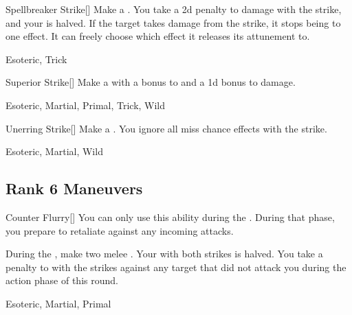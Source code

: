 \lowercase{\hypertarget{maneuver:Spellbreaker Strike}{}}\label{maneuver:Spellbreaker Strike}
\hypertarget{maneuver:Spellbreaker Strike}{}
\begin{freeability}[Rank 5]{Spellbreaker Strike}[]
Make a .
You take a \minus2d penalty to damage with the strike, and your  is halved.
If the target takes damage from the strike, it stops being  to one effect.
It can freely choose which effect it releases its attunement to.


 Esoteric, Trick
\end{freeability}
\vspace{0.25em}



\lowercase{\hypertarget{maneuver:Superior Strike}{}}\label{maneuver:Superior Strike}
\hypertarget{maneuver:Superior Strike}{}
\begin{freeability}[Rank 5]{Superior Strike}[]
Make a  with a  bonus to  and a \plus1d bonus to damage.


 Esoteric, Martial, Primal, Trick, Wild
\end{freeability}
\vspace{0.25em}



\lowercase{\hypertarget{maneuver:Unerring Strike}{}}\label{maneuver:Unerring Strike}
\hypertarget{maneuver:Unerring Strike}{}
\begin{freeability}[Rank 5]{Unerring Strike}[]
Make a .
You ignore all miss chance effects with the strike.


 Esoteric, Martial, Wild
\end{freeability}
\vspace{0.25em}


\subsection{Rank 6 Maneuvers}

\lowercase{\hypertarget{maneuver:Counter Flurry}{}}\label{maneuver:Counter Flurry}
\hypertarget{maneuver:Counter Flurry}{}
\begin{freeability}[Rank 6]{Counter Flurry}[]
You can only use this ability during the .
During that phase, you prepare to retaliate against any incoming attacks.

During the , make two melee .
Your  with both strikes is halved.
You take a  penalty to  with the strikes against any target that did not attack you during the action phase of this round.


 Esoteric, Martial, Primal
\end{freeability}
\vspace{0.25em}




